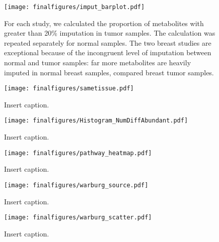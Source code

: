 \documentclass[10pt]{article}
\begin{document}
\begin{figure}[ht!]
  \centering
     \texttt{[image: finalfigures/imput\_barplot.pdf]}
  \caption{For each study, we calculated the proportion of metabolites with greater than 20\% imputation in tumor samples. The calculation was repeated separately for normal samples. The two breast studies are exceptional because of the incongruent level of imputation between normal and tumor samples: far more metabolites are heavily imputed in normal breast samples, compared breast tumor samples. }
     \label{fig:SIFig_Imputation}
\end{figure}

\begin{figure}[ht!]
  \centering
     \texttt{[image: finalfigures/sametissue.pdf]}
  \caption{Insert caption.}
     \label{fig:SIFig_SameTissue}
\end{figure}

\begin{figure}[ht!]
  \centering
     \texttt{[image: finalfigures/Histogram\_NumDiffAbundant.pdf]}
  \caption{Insert caption.}
     \label{fig:SIFig_HistogramDiffAbundance}
\end{figure}
 

\begin{figure}[ht!]
  \centering
     \texttt{[image: finalfigures/pathway\_heatmap.pdf]}
  \caption{Insert caption.}
     \label{fig:SIFig_PathwayHeatmap}
\end{figure}

\begin{figure}[ht!]
  \centering
     \texttt{[image: finalfigures/warburg\_source.pdf]}
  \caption{Insert caption.}
     \label{fig:SIFig_WarburgSource}
\end{figure}

\begin{figure}[ht!]
  \centering
     \texttt{[image: finalfigures/warburg\_scatter.pdf]}
  \caption{Insert caption.}
     \label{fig:SIFig_WarburgScatter}
\end{figure}

 
\end{document}
